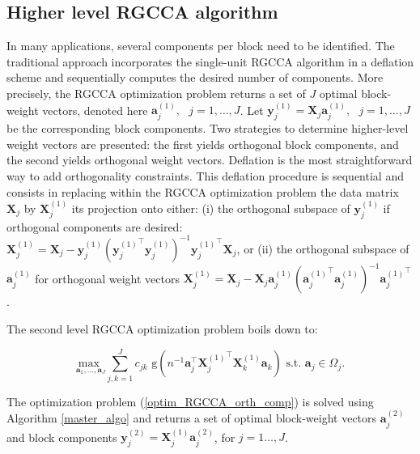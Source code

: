 \documentclass[
]{jss}
\begin{document}
\subsection{Higher level RGCCA
algorithm}\label{higher-level-rgcca-algorithm}

In many applications, several components per block need to be
identified. The traditional approach incorporates the single-unit RGCCA
algorithm in a deflation scheme and sequentially computes the desired
number of components. More precisely, the RGCCA optimization problem
returns a set of \(J\) optimal block-weight vectors, denoted here
\(\mathbf a_j^{(1)}, \text{ } j = 1, \ldots, J\). Let
\(\mathbf y_j^{(1)} = \mathbf X_j \mathbf a_j^{(1)}, \text{ } j = 1, \ldots, J\)
be the corresponding block components. Two strategies to determine
higher-level weight vectors are presented: the first yields orthogonal
block components, and the second yields orthogonal weight vectors.
Deflation is the most straightforward way to add orthogonality
constraints. This deflation procedure is sequential and consists in
replacing within the RGCCA optimization problem the data matrix
\(\mathbf X_j\) by \(\mathbf X_j^{(1)}\) its projection onto either: (i)
the orthogonal subspace of \(\mathbf y_j^{(1)}\) if orthogonal
components are desired:
\(\mathbf X_j^{(1)} = \mathbf X_j -  \mathbf y_j^{(1)} \left( { \mathbf y_j^{(1)}}^\top  \mathbf y_j^{(1)} \right)^{-1}{ \mathbf y_j^{(1)}}^\top \mathbf X_j\),
or (ii) the orthogonal subspace of \(\mathbf a_j^{(1)}\) for orthogonal
weight vectors
\(\mathbf X_j^{(1)} = \mathbf X_j - \mathbf X_j \mathbf a_j^{(1)} \left( { \mathbf a_j^{(1)}}^\top  \mathbf a_j^{(1)} \right)^{-1}{ \mathbf a_j^{(1)}}^\top\).

The second level RGCCA optimization problem boils down to:

\begin{equation}
        \underset{ \mathbf a_1, \ldots, \mathbf a_J}{\text{max }} \sum_{j, k = 1}^J c_{jk} \text{ g}\left(n^{-1} \mathbf a_j^\top {\mathbf X_j^{(1)}}^\top \mathbf X_k^{(1)}  \mathbf a_k \right)
        \text{ s.t. }  \mathbf a_j \in \Omega_j.
    \label{optim_RGCCA_orth_comp}
\end{equation}

The optimization problem (\ref{optim_RGCCA_orth_comp}) is solved using
Algorithm \ref{master_algo} and returns a set of optimal block-weight
vectors \(\mathbf a_j^{(2)}\) and block components
\(\mathbf y_j^{(2)} = \mathbf X_j^{(1)} \mathbf a_j^{(2)}\), for
\(j = 1\ldots, J\).
\end{document}
